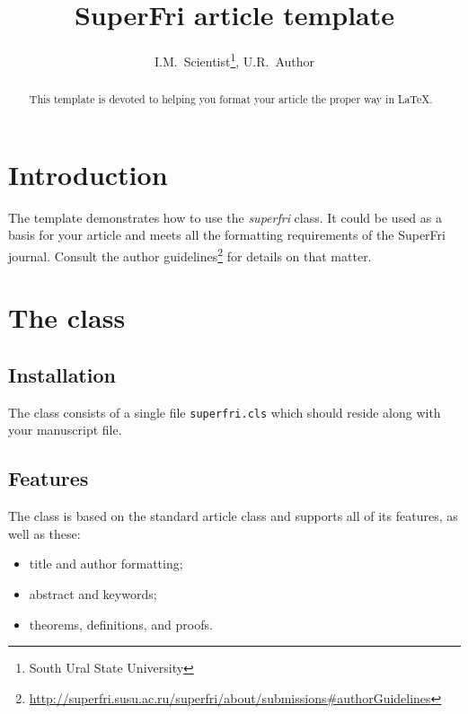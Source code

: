 \documentclass{superfri}
\begin{document}
\author{I.M.~Scientist\footnote{\label{susu}South Ural State University}, U.R.~Author}

\title{SuperFri article template}

\maketitle{}

\begin{abstract}%
This template is devoted to helping you format your article the proper way in
\LaTeX.

\end{abstract}

\section*{Introduction}
\label{sec:intro}
The template demonstrates how to use the \emph{superfri} class. It could be
used as a basis for your article and meets all the formatting requirements of
the SuperFri journal. Consult the author
guidelines\footnote{\url{http://superfri.susu.ac.ru/superfri/about/submissions#authorGuidelines}}
for details on that matter.

\section{The class}

\subsection{Installation}
The class consists of a single file \verb=superfri.cls= which should reside
along with your manuscript file.

\subsection{Features}
The class is based on the standard article class and supports all of its
features, as well as these:
\begin{itemize}
\item title and author formatting;
\item abstract and keywords;
\item theorems, definitions, and proofs.
\end{itemize}
\end{document}
